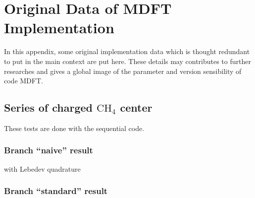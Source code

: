
\chapter{Original Data of MDFT Implementation\label{chpt:original_data}}

In this appendix, some original implementation data which is thought
redundant to put in the main context are put here. These details may
contributes to further researches and gives a global image of the
parameter and version sensibility of code MDFT.

\section{Series of charged $\mathrm{C}\mathrm{H}_{4}$ center}

These tests are done with the sequential code.

\subsection{Branch ``naive'' result}

with Lebedev quadrature

\subsection{Branch ``standard'' result}
